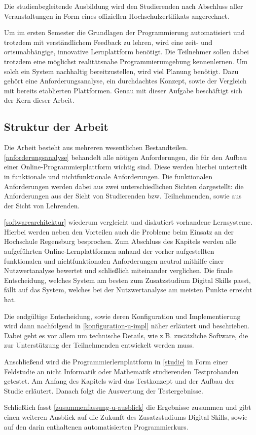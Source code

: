 \newpage

Die studienbegleitende Ausbildung wird den Studierenden nach Abschluss aller
Veranstaltungen in Form eines offiziellen Hochschulzertifikats angerechnet.

Um im ersten Semester die Grundlagen der Programmierung automatisiert und
trotzdem mit verständlichem Feedback zu lehren, wird eine zeit- und
ortsunabhängige, innovative Lernplattform benötigt. Die Teilnehmer sollen dabei
trotzdem eine möglichst realitätsnahe Programmierumgebung kennenlernen. Um solch
ein System nachhaltig bereitzustellen, wird viel Planung benötigt. Dazu gehört
eine Anforderungsanalyse, ein durchdachtes Konzept, sowie der Vergleich
mit bereits etablierten Plattformen. Genau mit dieser Aufgabe beschäftigt sich
der Kern dieser Arbeit.

\subsection{Struktur der Arbeit}\label{struktur-der-arbeit}
Die Arbeit besteht aus mehreren wesentlichen Bestandteilen.
\autoref{anforderungsanalyse} behandelt alle nötigen Anforderungen, die für den
Aufbau einer Online-Programmierplattform wichtig sind. Diese werden hierbei
unterteilt in funktionale und nichtfunktionale Anforderungen. Die funktionalen
Anforderungen werden dabei aus zwei unterschiedlichen Sichten dargestellt: die
Anforderungen aus der Sicht von Studierenden bzw. Teilnehmenden, sowie aus der
Sicht von Lehrenden.

\autoref{softwarearchitektur} wiederum vergleicht und diskutiert vorhandene
Lernsysteme. Hierbei werden neben den Vorteilen auch die Probleme beim Einsatz
an der Hochschule Regensburg besprochen. Zum Abschluss des Kapitels werden alle
aufgeführten Online-Lernplattformen anhand der vorher aufgestellten funktionalen
und nichtfunktionalen Anforderungen neutral mithilfe einer Nutzwertanalyse
bewertet und schließlich miteinander verglichen. Die finale Entscheidung,
welches System am besten zum Zusatzstudium Digital Skills passt, fällt auf das
System, welches bei der Nutzwertanalyse am meisten Punkte erreicht hat.

Die endgültige Entscheidung, sowie deren Konfiguration und Implementierung wird
dann nachfolgend in \autoref{konfiguration-u-impl} näher erläutert und
beschrieben. Dabei geht es vor allem um technische Details, wie z.B. zusätzliche
Software, die zur Unterstützung der Teilnehmenden entwickelt werden muss.

Anschließend wird die Programmierlernplattform in \autoref{studie} in Form
einer Feldstudie an nicht Informatik oder Mathematik studierenden Testprobanden
getestet. Am Anfang des Kapitels wird das Testkonzept und der Aufbau der Studie
erläutert. Danach folgt die Auswertung der Testergebnisse.

Schließlich fasst \autoref{zusammenfassung-u-ausblick} die Ergebnisse
zusammen und gibt einen weiteren Ausblick auf die Zukunft des Zusatzstudiums
Digital Skills, sowie auf den darin enthaltenen automatisierten Programmierkurs.